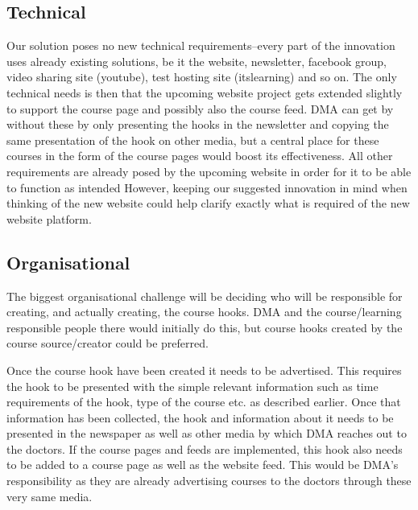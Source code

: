\subsection{Technical}
Our solution poses no new technical requirements--every part of the innovation uses already existing solutions, be it the website, newsletter, facebook group, video sharing site (youtube), test hosting site (itslearning) and so on. The only technical needs is then that the upcoming website project gets extended slightly to support the course page and possibly also the course feed. DMA can get by without these by only presenting the hooks in the newsletter and copying the same presentation of the hook on other media, but a central place for these courses in the form of the course pages would boost its effectiveness. All other requirements are already posed by the upcoming website in order for it to be able to function as intended However, keeping our suggested innovation in mind when thinking of the new website could help clarify exactly what is required of the new website platform.

\subsection{Organisational}
The biggest organisational challenge will be deciding who will be responsible for creating, and actually creating, the course hooks. DMA and the course/learning responsible people there would initially do this, but course hooks created by the course source/creator could be preferred. 

Once the course hook have been created it needs to be advertised. This requires the hook to be presented with the simple relevant information such as time requirements of the hook, type of the course etc. as described earlier. Once that information has been collected, the hook and information about it needs to be presented in the newspaper as well as other media by which DMA reaches out to the doctors. If the course pages and feeds are implemented, this hook also needs to be added to a course page as well as the website feed. This would be DMA’s responsibility as they are already advertising courses to the doctors through these very same media.